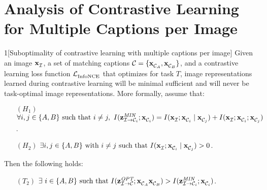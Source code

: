 
\section{Analysis of Contrastive Learning for Multiple Captions per Image}
\label{app:analysis-of-contrastive}

\begin{thm}{1}[Suboptimality of contrastive learning with multiple captions per image]
	\label{thm:suboptimality-app}	
	Given an image $\mathbf{x}_{\mathcal{I}}^{}{}$, a set of matching captions $\mathcal{C} = \{ \mathbf{x}_{\mathcal{C}_{A}}^{}, \mathbf{x}_{\mathcal{C}_{B}}^{} \}$, and a contrastive learning loss function $\mathcal{L}_{\text{InfoNCE}}^{}$ that optimizes for task $T$, 
	image representations learned during contrastive learning will be minimal sufficient and will never be task-optimal image representations.
	More formally, assume that:
	\begin{itemize}
		\item[$(H_1)$] $\forall i, j \in \{A, B\}\ \text{such that}\ i \neq j,\ I(\zminsuff{i} ; \capt{}{i}) = I(\img{}{} ; \capt{}{i} \mid \capt{}{j}) + I(\img{}{} ; \capt{}{i} ; \capt{}{j})$.
		\item[$(H_2)$] $\exists i, j \in \{A, B\}\ \text{with}\ i \neq j\ \text{such that}\ I(\mathbf{x}_{\mathcal{I}}^{}{} ; \mathbf{x}_{\mathcal{C}_{i}}^{} \mid \mathbf{x}_{\mathcal{C}_{j}}^{}) > 0$.
	\end{itemize}
	Then the following holds:
	\begin{itemize}
		\item[$(T_2)$] $\exists \ i \in \{A, B\}\ \text{such that}\ I(\zoptimal{}{\mathcal{C}} ; \capt{}{A}\capt{}{B}) > I(\zminsuff{i} ; \capt{}{i})$.
	\end{itemize} 
\end{thm}

